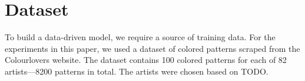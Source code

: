 \section{Dataset}
\label{sec:dataset}


To build a data-driven model, we require a source of training data. For the experiments in this paper, we used a dataset of colored patterns scraped from the Colourlovers website. The dataset contains 100 colored patterns for each of 82 artists---8200 patterns in total. The artists were chosen based on TODO.~